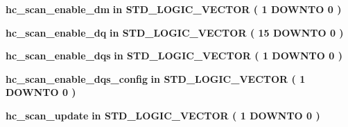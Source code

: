\begin{DoxyCompactItemize}
\item 
{\bf hc\+\_\+scan\+\_\+enable\+\_\+dm}  {\bfseries {\bfseries \textcolor{keywordflow}{in}\textcolor{vhdlchar}{ }}} {\bfseries \textcolor{comment}{S\+T\+D\+\_\+\+L\+O\+G\+I\+C\+\_\+\+V\+E\+C\+T\+OR}\textcolor{vhdlchar}{ }\textcolor{vhdlchar}{(}\textcolor{vhdlchar}{ }\textcolor{vhdlchar}{ } \textcolor{vhdldigit}{1} \textcolor{vhdlchar}{ }\textcolor{keywordflow}{D\+O\+W\+N\+TO}\textcolor{vhdlchar}{ }\textcolor{vhdlchar}{ } \textcolor{vhdldigit}{0} \textcolor{vhdlchar}{ }\textcolor{vhdlchar}{)}\textcolor{vhdlchar}{ }} 
\item 
{\bf hc\+\_\+scan\+\_\+enable\+\_\+dq}  {\bfseries {\bfseries \textcolor{keywordflow}{in}\textcolor{vhdlchar}{ }}} {\bfseries \textcolor{comment}{S\+T\+D\+\_\+\+L\+O\+G\+I\+C\+\_\+\+V\+E\+C\+T\+OR}\textcolor{vhdlchar}{ }\textcolor{vhdlchar}{(}\textcolor{vhdlchar}{ }\textcolor{vhdlchar}{ } \textcolor{vhdldigit}{15} \textcolor{vhdlchar}{ }\textcolor{keywordflow}{D\+O\+W\+N\+TO}\textcolor{vhdlchar}{ }\textcolor{vhdlchar}{ } \textcolor{vhdldigit}{0} \textcolor{vhdlchar}{ }\textcolor{vhdlchar}{)}\textcolor{vhdlchar}{ }} 
\item 
{\bf hc\+\_\+scan\+\_\+enable\+\_\+dqs}  {\bfseries {\bfseries \textcolor{keywordflow}{in}\textcolor{vhdlchar}{ }}} {\bfseries \textcolor{comment}{S\+T\+D\+\_\+\+L\+O\+G\+I\+C\+\_\+\+V\+E\+C\+T\+OR}\textcolor{vhdlchar}{ }\textcolor{vhdlchar}{(}\textcolor{vhdlchar}{ }\textcolor{vhdlchar}{ } \textcolor{vhdldigit}{1} \textcolor{vhdlchar}{ }\textcolor{keywordflow}{D\+O\+W\+N\+TO}\textcolor{vhdlchar}{ }\textcolor{vhdlchar}{ } \textcolor{vhdldigit}{0} \textcolor{vhdlchar}{ }\textcolor{vhdlchar}{)}\textcolor{vhdlchar}{ }} 
\item 
{\bf hc\+\_\+scan\+\_\+enable\+\_\+dqs\+\_\+config}  {\bfseries {\bfseries \textcolor{keywordflow}{in}\textcolor{vhdlchar}{ }}} {\bfseries \textcolor{comment}{S\+T\+D\+\_\+\+L\+O\+G\+I\+C\+\_\+\+V\+E\+C\+T\+OR}\textcolor{vhdlchar}{ }\textcolor{vhdlchar}{(}\textcolor{vhdlchar}{ }\textcolor{vhdlchar}{ } \textcolor{vhdldigit}{1} \textcolor{vhdlchar}{ }\textcolor{keywordflow}{D\+O\+W\+N\+TO}\textcolor{vhdlchar}{ }\textcolor{vhdlchar}{ } \textcolor{vhdldigit}{0} \textcolor{vhdlchar}{ }\textcolor{vhdlchar}{)}\textcolor{vhdlchar}{ }} 
\item 
{\bf hc\+\_\+scan\+\_\+update}  {\bfseries {\bfseries \textcolor{keywordflow}{in}\textcolor{vhdlchar}{ }}} {\bfseries \textcolor{comment}{S\+T\+D\+\_\+\+L\+O\+G\+I\+C\+\_\+\+V\+E\+C\+T\+OR}\textcolor{vhdlchar}{ }\textcolor{vhdlchar}{(}\textcolor{vhdlchar}{ }\textcolor{vhdlchar}{ } \textcolor{vhdldigit}{1} \textcolor{vhdlchar}{ }\textcolor{keywordflow}{D\+O\+W\+N\+TO}\textcolor{vhdlchar}{ }\textcolor{vhdlchar}{ } \textcolor{vhdldigit}{0} \textcolor{vhdlchar}{ }\textcolor{vhdlchar}{)}\textcolor{vhdlchar}{ }} 

\end{DoxyCompactItemize}
